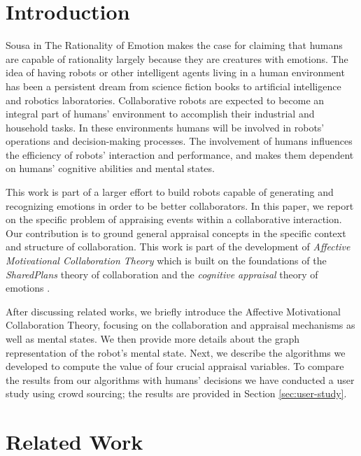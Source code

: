 \documentclass{aamas2016}
\begin{document}


\section{Introduction}
Sousa in The Rationality of Emotion \cite{sousa:rationality-emotion}
makes the case for claiming that humans are capable of rationality largely
because they are creatures with emotions. The idea of having robots or other
intelligent agents living in a human environment has been a persistent dream
from science fiction books to artificial intelligence and robotics laboratories.
Collaborative robots are expected to become an integral part of humans'
environment to accomplish their industrial and household tasks. In these
environments humans will be involved in robots' operations and decision-making
processes. The involvement of humans influences the efficiency of robots'
interaction and performance, and makes them dependent on humans' cognitive
abilities and mental states.

This work is part of a larger effort to build robots capable of generating and
recognizing emotions in order to be better collaborators. In this paper, we
report on the specific problem of appraising events within a collaborative
interaction. Our contribution is to ground general appraisal concepts in the
specific context and structure of collaboration. This work is part of the
development of \textit{Affective Motivational Collaboration Theory} which is
built on the foundations of the \textit{SharedPlans} theory of collaboration
\cite{grosz:plans-discourse} and the \textit{cognitive appraisal} theory of
emotions \cite{gratch:domain-independent}.

After discussing related works, we briefly introduce the Affective Motivational
Collaboration Theory, focusing on the collaboration and appraisal mechanisms as
well as mental states. We then provide more details about the graph
representation of the robot's mental state. Next, we describe the algorithms we
developed to compute the value of four crucial appraisal variables. To compare
the results from our algorithms with humans' decisions we have conducted a user
study using crowd sourcing; the results are provided in Section
\ref{sec:user-study}.

\vspace*{-2mm}
\section{Related Work}
\end{document}
